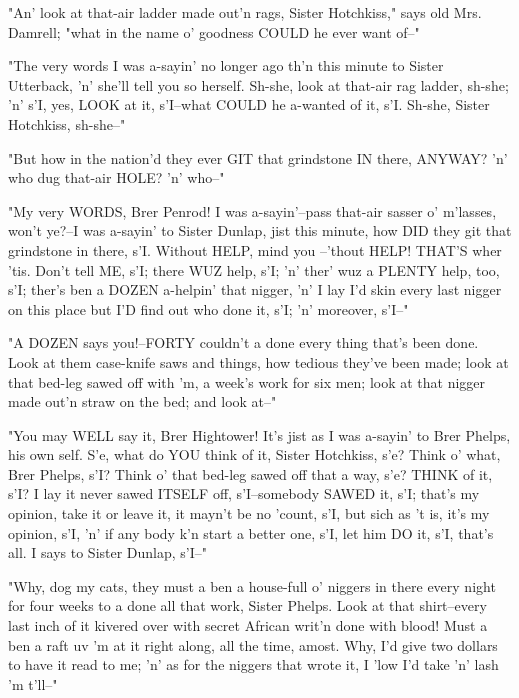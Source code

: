 "An' look at that-air ladder made out'n rags, Sister Hotchkiss," says old
Mrs. Damrell; "what in the name o' goodness COULD he ever want of--"

"The very words I was a-sayin' no longer ago th'n this minute to Sister
Utterback, 'n' she'll tell you so herself.  Sh-she, look at that-air rag
ladder, sh-she; 'n' s'I, yes, LOOK at it, s'I--what COULD he a-wanted of
it, s'I.  Sh-she, Sister Hotchkiss, sh-she--"

"But how in the nation'd they ever GIT that grindstone IN there, ANYWAY?
'n' who dug that-air HOLE? 'n' who--"

"My very WORDS, Brer Penrod!  I was a-sayin'--pass that-air sasser o'
m'lasses, won't ye?--I was a-sayin' to Sister Dunlap, jist this minute,
how DID they git that grindstone in there, s'I.  Without HELP, mind you
--'thout HELP!  THAT'S wher 'tis.  Don't tell ME, s'I; there WUZ help,
s'I; 'n' ther' wuz a PLENTY help, too, s'I; ther's ben a DOZEN a-helpin'
that nigger, 'n' I lay I'd skin every last nigger on this place but I'D
find out who done it, s'I; 'n' moreover, s'I--"

"A DOZEN says you!--FORTY couldn't a done every thing that's been done.
Look at them case-knife saws and things, how tedious they've been made;
look at that bed-leg sawed off with 'm, a week's work for six men; look
at that nigger made out'n straw on the bed; and look at--"

"You may WELL say it, Brer Hightower!  It's jist as I was a-sayin' to
Brer Phelps, his own self.  S'e, what do YOU think of it, Sister
Hotchkiss, s'e? Think o' what, Brer Phelps, s'I?  Think o' that bed-leg
sawed off that a way, s'e?  THINK of it, s'I?  I lay it never sawed
ITSELF off, s'I--somebody SAWED it, s'I; that's my opinion, take it or
leave it, it mayn't be no 'count, s'I, but sich as 't is, it's my
opinion, s'I, 'n' if any body k'n start a better one, s'I, let him DO it,
s'I, that's all.  I says to Sister Dunlap, s'I--"

"Why, dog my cats, they must a ben a house-full o' niggers in there every
night for four weeks to a done all that work, Sister Phelps.  Look at
that shirt--every last inch of it kivered over with secret African writ'n
done with blood!  Must a ben a raft uv 'm at it right along, all the
time, amost.  Why, I'd give two dollars to have it read to me; 'n' as for
the niggers that wrote it, I 'low I'd take 'n' lash 'm t'll--"

